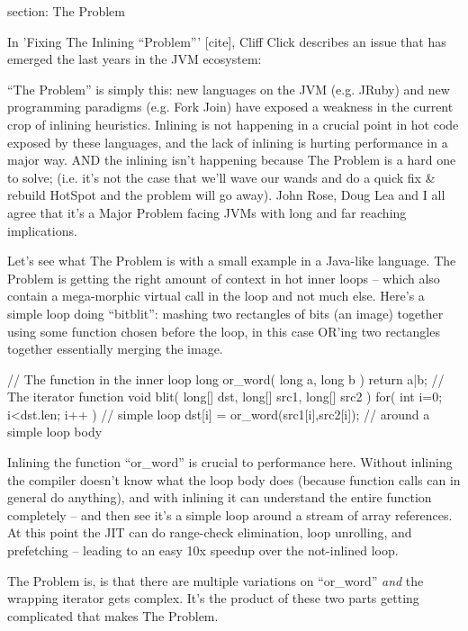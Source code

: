 section: The Problem

In 'Fixing The Inlining ``Problem''' [cite], Cliff Click describes an issue
that has emerged the last years in the JVM ecosystem:

“The Problem” is simply this: new languages on the JVM (e.g. JRuby) and new
programming paradigms (e.g. Fork Join) have exposed a weakness in the current
crop of inlining heuristics.  Inlining is not happening in a crucial point in
hot code exposed by these languages, and the lack of inlining is hurting
performance in a major way.  AND the inlining isn’t happening because The
Problem is a hard one to solve; (i.e. it’s not the case that we’ll wave our
wands and do a quick fix & rebuild HotSpot and the problem will go away).   John
Rose, Doug Lea and I all agree that it’s a Major Problem facing JVMs with long
and far reaching implications.

Let's see what The Problem is with a small example in a Java-like language. The
Problem is getting the right amount of context in hot inner loops – which also
contain a mega-morphic virtual call in the loop and not much else.  Here’s a
simple loop doing “bitblit”: mashing two rectangles of bits (an image) together
using some function chosen before the loop, in this case OR’ing two rectangles
together essentially merging the image.

  // The function in the inner loop
  long or_word( long a, long b ) { return a|b; }
  // The iterator function
  void blit( long[] dst, long[] src1, long[] src2 ) {
    for( int i=0; i<dst.len; i++ )        // simple loop
      dst[i] = or_word(src1[i],src2[i]);  //   around a simple loop body
  }
  
Inlining the function “or_word” is crucial to performance here.  Without
inlining the compiler doesn’t know what the loop body does (because function
calls can in general do anything), and with inlining it can understand the
entire function completely – and then see it’s a simple loop around a stream of
array references.  At this point the JIT can do range-check elimination, loop
unrolling, and prefetching – leading to an easy 10x speedup over the not-inlined
loop.

The Problem is, is that there are multiple variations on “or_word” \emph{and}
the wrapping iterator gets complex.  It’s the product of these two parts getting
complicated that makes The Problem.

